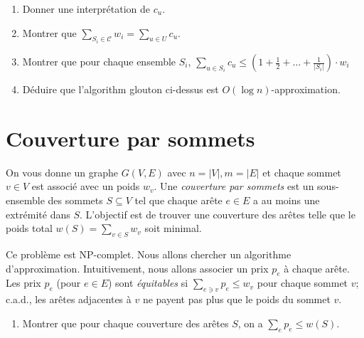 \documentclass[12pt]{article}
\begin{document}
\begin{enumerate}
	\item Donner une interprétation de $c_{u}$.
	\item Montrer que $\sum_{S_{i} \in \mathcal{C}} w_{i} = \sum_{u \in U} c_{u}$.
	\item Montrer que pour chaque ensemble $S_{i}$, 
		$
			\sum_{u \in S_{i}} c_{u} \leq \left( 1 + \frac{1}{2} + \ldots + \frac{1}{|S_{i}|} \right) \cdot w_{i}
		$
	\item Déduire que l'algorithm glouton ci-dessus est $O(\log n)$-approximation.
\end{enumerate}

\section{Couverture par sommets}

\begin{figwindow}
On vous donne un graphe $G(V,E)$ avec $n=|V| , m=|E|$ 
et chaque sommet $v \in V$ est associé avec un poids $w_{v}$.
Une \emph{couverture par sommets} est un sous-ensemble des sommets $S\subseteq V$ tel que
chaque arête $e \in E$ a au moins une extrémité dans $S$.
L'objectif est de trouver une couverture des arêtes telle que le poids total 
$w(S) = \sum_{v \in S} w_{v}$ soit minimal.
%

Ce problème est NP-complet. Nous allons chercher un algorithme d'approximation.
Intuitivement, nous allons associer un prix $p_{e}$ à chaque arête. Les prix $p_{e}$ (pour $e \in E$) sont 
\emph{équitables} si $\sum_{e\ni v} p_{e} \leq w_{v}$ pour chaque sommet $v$; c.a.d., 
les arêtes adjacentes à $v$ ne payent pas plus que le poids du sommet $v$. 
\end{figwindow}

\begin{enumerate}
	\item Montrer que pour chaque couverture des arêtes $S$, on a $\sum_{e} p_{e} \leq w(S)$.
\end{enumerate}
\end{document}
